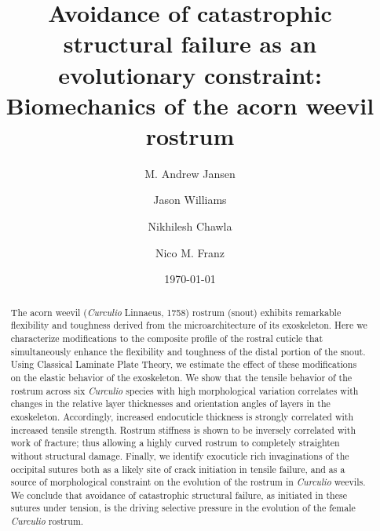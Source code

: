 \documentclass[twocolumn, linenumbers, superscriptaddress, nofootinbib]{revtex4-1}
\begin{document}
	\begin{abstract}
		The acorn weevil (\textit{Curculio} Linnaeus, 1758) rostrum (snout) exhibits remarkable flexibility and toughness derived from the microarchitecture of its exoskeleton.
		Here we characterize modifications to the composite profile of the rostral cuticle that simultaneously enhance the flexibility and toughness of the distal portion of the snout.
		Using Classical Laminate Plate Theory, we estimate the effect of these modifications on the elastic behavior of the exoskeleton.
		We show that the tensile behavior of the rostrum across six \textit{Curculio} species with high morphological variation correlates with changes in the relative layer thicknesses and orientation angles of layers in the exoskeleton.
		Accordingly, increased endocuticle thickness is strongly correlated with increased tensile strength.
		Rostrum stiffness is shown to be inversely correlated with work of fracture; thus allowing a highly curved rostrum to completely straighten without structural damage.
		Finally, we identify exocuticle rich invaginations of the occipital sutures both as a likely site of crack initiation in tensile failure, and as a source of morphological constraint on the evolution of the rostrum in \textit{Curculio} weevils.
		We conclude that avoidance of catastrophic structural failure, as initiated in these sutures under tension, is the driving selective pressure in the evolution of the female \textit{Curculio} rostrum.
	\end{abstract}
	
	{\title{Avoidance of catastrophic structural failure as an evolutionary constraint: Biomechanics of the acorn weevil rostrum}
	\date{\today}
	
	\author{M. Andrew Jansen}
	\author{Jason Williams}
	\author{Nikhilesh Chawla}
	\author{Nico M. Franz}
		
	\maketitle
	}
\end{document}
